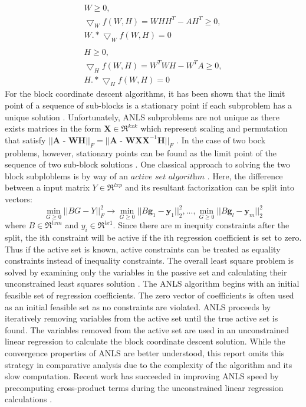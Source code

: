 \documentclass[final,leqno,onefignum,onetabnum]{siamltex1213}
\begin{document}
\begin{equation}\label{EKx}
 \begin{align}
  W \ge 0,\\
  \bigtriangledown_W f(W,H)  = WHH^T - AH^T \ge 0,\\
  W.* \bigtriangledown_Wf(W,H) = 0\\ \\
    H \ge 0,\\ 
  \bigtriangledown_H f(W,H)  = W^T WH - W^T A \ge 0,\\
  H.* \bigtriangledown_Hf(W,H) = 0  
  \end{align}
\end{equation}
For the block coordinate descent algorithms, it has been shown that the limit point of a sequence of sub-blocks is a stationary point if each subproblem has a unique solution \cite{Ber2}. Unfortunately, ANLS subproblems are not unique as there exists matrices in the form $ \textbf{X} \in \Re^{kxk} $ which represent scaling and permutation that satisfy $ || \textbf{A - WH} ||_{F} = || \textbf{A - WXX}^{-1} \textbf{H} ||_{F} $ \cite{Kim1}.  In the case of two bock problems, however, stationary points can be found as the limit point of the sequence of two sub-block solutions \cite{Gri}. One classical approach to solving the two block subploblems is by way of an $\textit{active set algorithm}$ \cite{Law}. Here, the difference between a input matrix $ Y \in \Re^{lxp}$  and its resultant factorization can be split into vectors:
\begin{equation}
    \min_{G \ge 0} || BG-Y ||^{2}_{F} \to  \min_{G \ge 0} || B\textbf{g}_1-\textbf{y}_1 ||^{2}_{2}, ...,   \min_{G \ge 0} || B\textbf{g}_l-\textbf{y}_m ||^{2}_{2}
\end{equation}
where $ B \in \Re^{lxm}$ and $y_i \in \Re^{lx1}$. Since there are m inequity constraints after the split, the ith constraint will be active if the ith regression coefficient is set to zero. Thus if the active set is known, active constraints can be treated as equality constraints instead of inequality constraints. The overall least square problem is solved by examining only the variables in the passive set and calculating their unconstrained least squares solution \cite{Bro}. The ANLS algorithm begins with an initial feasible set of regression coefficients. The zero vector of coefficients is often used as an initial feasible set as no constraints are violated. ANLS proceeds by iteratively removing variables from the active set until the true active set is found. The variables removed from the active set are used in an unconstrained linear regression to calculate the block coordinate descent solution. While the convergence properties of ANLS are better understood, this report omits this strategy in comparative analysis due to the complexity of the algorithm and its slow computation. Recent work has succeeded in improving ANLS speed by precomputing cross-product terms during the unconstrained linear regression calculations \cite{Bro}. 
\end{document}
